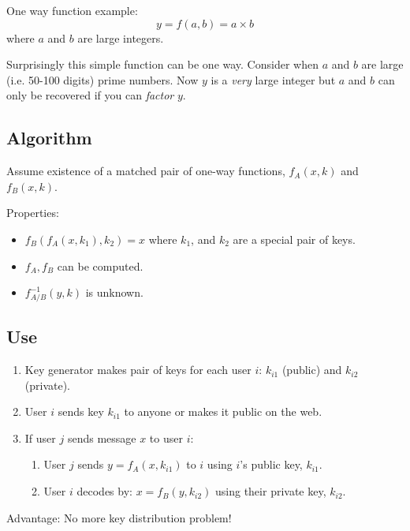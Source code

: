 \documentclass{article}	%
\begin{document}
One way function example: 
\[
y = f(a,b) = a \times b
\]
\noindent
where $a$ and $b$ are large integers.

Surprisingly this simple function can be one way.   Consider when $a$ and $b$ are 
large (i.e. 50-100 digits) prime numbers.   Now $y$ is a {\it very} large integer
but $a$ and $b$ can only be recovered if you can {\it factor} $y$.


\subsection{Algorithm}
Assume existence of a matched pair of one-way functions,
$f_A(x,k)$ and $f_B(x,k)$.


Properties:
\begin{itemize}
	\item $f_B(f_A(x,k_1),k_2) = x$
                 where $k_1$, and $k_2$ are a special pair of keys.
        \item $f_A, f_B$ can be computed.
        \item $f^{-1}_{A/B}(y,k)$ is unknown.
\end{itemize}

\subsection{Use}
\begin{enumerate}
	\item Key generator makes pair of keys for each user $i$:
        $k_{i1}$ (public) and $k_{i2}$ (private).

        \item User $i$ sends key $k_{i1}$ to anyone or makes it public
        on the web.

        \item If user $j$ sends message $x$ to user $i$:
        \begin{enumerate}
        	\item User $j$ sends $y = f_A(x, k_{i1})$ to $i$
                using $i$'s public key, $k_{i1}$.

                \item User $i$ decodes by: $x = f_B(y, k_{i2})$ using
                their private key, $k_{i2}$.
       \end{enumerate}
 \end{enumerate}

Advantage:  No more key distribution problem!
\end{document}
